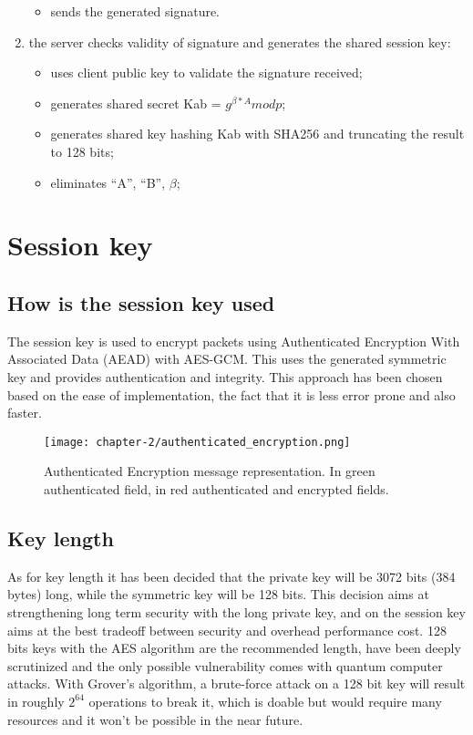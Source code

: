 \begin{enumerate}
\begin{itemize}
		\item sends the generated signature. 
	\end{itemize}
	\item the server checks validity of signature and generates the shared session key:
	\begin{itemize}
		\item uses client public key to validate the signature received;
		\item generates shared secret Kab = \(g^{\beta*A} mod p\);
		\item generates shared key hashing Kab with SHA256 and truncating the result to 128 bits;
		\item eliminates ``A'', ``B'', \(\beta\);
	\end{itemize}	 
\end{enumerate}

\newpage{}
\section{Session key}

\subsection{How is the session key used}

The session key is used to encrypt packets using Authenticated Encryption With Associated Data (AEAD) with AES-GCM. This uses the generated symmetric key and provides authentication and integrity. This approach has been chosen based on the ease of implementation, the fact that it is less error prone and also faster. 

\begin{figure}[!h] 
    \centering 
    \texttt{[image: chapter-2/authenticated\_encryption.png]} 
    \caption{Authenticated Encryption message representation. In green authenticated field, in red authenticated and encrypted fields.}
    \label{fig:authenticated_encryption}
\end{figure}

\subsection{Key length}

As for key length it has been decided that the private key will be 3072 bits (384 bytes) long, while the symmetric key will be 128 bits. This decision aims at strengthening long term security with the long private key, and on the session key aims at the best tradeoff between security and overhead performance cost. 128 bits keys with the AES algorithm are the recommended length, have been deeply scrutinized and the only possible vulnerability comes with quantum computer attacks. With Grover's algorithm, a brute-force attack on a 128 bit key will result in roughly \(2^{64}\) operations to break it, which is doable but would require many resources and it won’t be possible in the near future.

